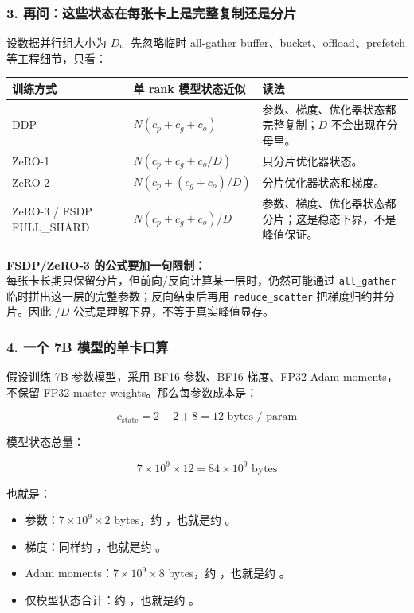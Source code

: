\subsubsection*{3. 再问：这些状态在每张卡上是完整复制还是分片}

设数据并行组大小为 $D$。先忽略临时 all-gather buffer、bucket、offload、prefetch 等工程细节，只看：

\begin{center}
{\small
\begin{tabular}{p{3.2cm}p{4.7cm}p{5cm}}
\hline
\textbf{训练方式} & \textbf{单 rank 模型状态近似} & \textbf{读法} \\
\hline
DDP & $N(c_p + c_g + c_o)$ & 参数、梯度、优化器状态都完整复制；$D$ 不会出现在分母里。 \\
ZeRO-1 & $N(c_p + c_g + c_o / D)$ & 只分片优化器状态。 \\
ZeRO-2 & $N(c_p + (c_g + c_o) / D)$ & 分片优化器状态和梯度。 \\
ZeRO-3 / FSDP FULL\_SHARD & $N(c_p + c_g + c_o) / D$ & 参数、梯度、优化器状态都分片；这是稳态下界，不是峰值保证。 \\
\hline
\end{tabular}
}
\end{center}

\begin{warnbox}
\textbf{FSDP/ZeRO-3 的公式要加一句限制：}\\
每张卡长期只保留分片，但前向/反向计算某一层时，仍然可能通过 \texttt{all\_gather} 临时拼出这一层的完整参数；反向结束后再用 \texttt{reduce\_scatter} 把梯度归约并分片。因此 $/D$ 公式是理解下界，不等于真实峰值显存。
\end{warnbox}

\subsubsection*{4. 一个 7B 模型的单卡口算}

假设训练 7B 参数模型，采用 BF16 参数、BF16 梯度、FP32 Adam moments，不保留 FP32 master weights。那么每参数成本是：

\[
c_{\text{state}} = 2 + 2 + 8 = 12 \text{ bytes / param}
\]

模型状态总量：

\[
7 \times 10^9 \times 12
= 84 \times 10^9 \text{ bytes}
\]

也就是：

\begin{itemize}[leftmargin=1.5em]
  \item 参数：$7 \times 10^9 \times 2$ bytes，约 ，也就是约 。
  \item 梯度：同样约 ，也就是约 。
  \item Adam moments：$7 \times 10^9 \times 8$ bytes，约 ，也就是约 。
  \item 仅模型状态合计：约 ，也就是约 。
\end{itemize}

